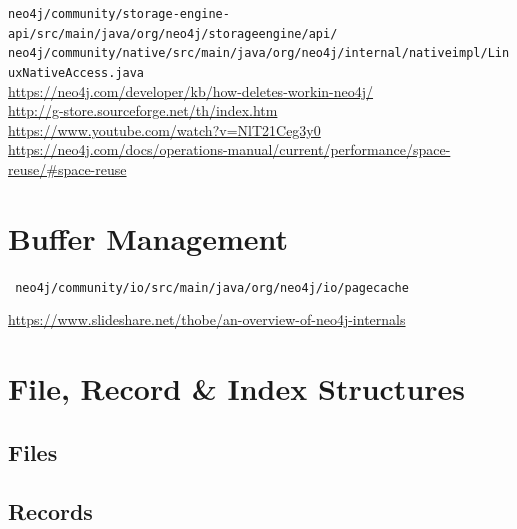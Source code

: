 \documentclass[a4paper,10pt]{article}
\begin{document}
\texttt{neo4j/community/storage-engine-api/src/main/java/org/neo4j/storageengine/api/} \\

\texttt{neo4j/community/native/src/main/java/org/neo4j/internal/nativeimpl/LinuxNativeAccess.java} \\

\href{Hpw delete works}{https://neo4j.com/developer/kb/how-deletes-workin-neo4j/} \\

\href{G-Store}{http://g-store.sourceforge.net/th/index.htm} \\

\href{Algorithms \& data structures}{https://www.youtube.com/watch?v=NlT21Ceg3y0}  \\

\href{Reusing space}{https://neo4j.com/docs/operations-manual/current/performance/space-reuse/\#space-reuse} \\


\section{Buffer Management}
\texttt{
neo4j/community/io/src/main/java/org/neo4j/io/pagecache
}

\href{Page Cache layout ??? Outdated ???}{https://www.slideshare.net/thobe/an-overview-of-neo4j-internals} \\


\section{File, Record \& Index Structures}
\subsection{Files}
    
\subsection{Records}
\end{document}
